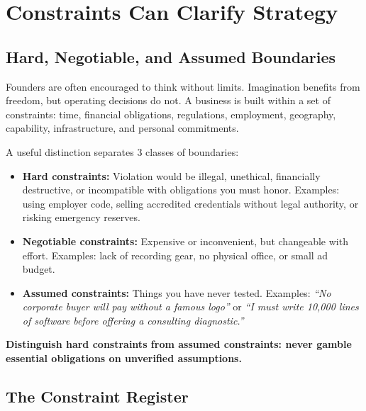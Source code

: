 \section{Constraints Can Clarify Strategy}

\subsection{Hard, Negotiable, and Assumed Boundaries}

Founders are often encouraged to think without limits. Imagination benefits from freedom, but operating decisions do not. A business is built within a set of constraints: time, financial obligations, regulations, employment, geography, capability, infrastructure, and personal commitments.

A useful distinction separates 3 classes of boundaries:

\begin{itemize}[leftmargin=11pt,itemsep=1.5pt,topsep=1.5pt,parsep=0pt]
  \item \textbf{Hard constraints:} Violation would be illegal, unethical, financially destructive, or incompatible with obligations you must honor. Examples: using employer code, selling accredited credentials without legal authority, or risking emergency reserves.
  \item \textbf{Negotiable constraints:} Expensive or inconvenient, but changeable with effort. Examples: lack of recording gear, no physical office, or small ad budget.
  \item \textbf{Assumed constraints:} Things you have never tested. Examples: \textit{``No corporate buyer will pay without a famous logo''} or \textit{``I must write 10,000 lines of software before offering a consulting diagnostic.''}
\end{itemize}

\textbf{Distinguish hard constraints from assumed constraints: never gamble essential obligations on unverified assumptions.}

\subsection{The Constraint Register}

